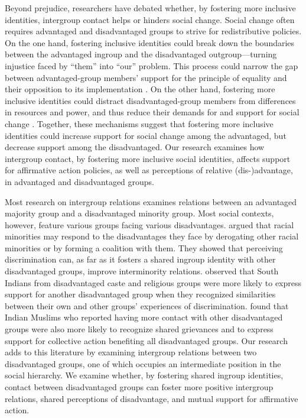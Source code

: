 \documentclass[12pt, a4paper]{article}
\begin{document}
Beyond prejudice, researchers have debated whether, by fostering more inclusive identities, intergroup contact helps or hinders social change. Social change often requires advantaged and disadvantaged groups to strive for redistributive policies. On the one hand, fostering inclusive identities could break down the boundaries between the advantaged ingroup and the disadvantaged outgroup---turning injustice faced by “them” into “our” problem. This process could narrow the gap between advantaged-group members’ support for the principle of equality and their opposition to its implementation \parencite{dixon_intergroup_2007}. On the other hand, fostering more inclusive identities could distract disadvantaged-group members from differences in resources and power, and thus reduce their demands for and support for social change \parencite{dixon_attitudes_2012, saguy_irony_2009}. Together, these mechanisms suggest that fostering more inclusive identities could increase support for social change among the advantaged, but decrease support among the disadvantaged. Our research examines how intergroup contact, by fostering more inclusive social identities, affects support for affirmative action policies, as well as perceptions of relative (dis-)advantage, in advantaged and disadvantaged groups.

Most research on intergroup relations examines relations between an advantaged majority group and a disadvantaged minority group. Most social contexts, however, feature various groups facing various disadvantages. \textcite{craig_coalition_2012} argued that racial minorities may respond to the disadvantages they face by derogating other racial minorities or by forming a coalition with them. They showed that perceiving discrimination can, as far as it fosters a shared ingroup identity with other disadvantaged groups, improve interminority relations. \textcite{vollhardt_inclusive_2016} observed that South Indians from disadvantaged caste and religious groups were more likely to express support for another disadvantaged group when they recognized similarities between their own and other groups’ experiences of discrimination. \textcite{dixon_contact_2017} found that Indian Muslims who reported having more contact with other disadvantaged groups were also more likely to recognize shared grievances and to express support for collective action benefiting all disadvantaged groups. Our research adds to this literature by examining intergroup relations between two disadvantaged groups, one of which occupies an intermediate position in the social hierarchy. We examine whether, by fostering shared ingroup identities, contact between disadvantaged groups can foster more positive intergroup relations, shared perceptions of disadvantage, and mutual support for affirmative action.
\end{document}
